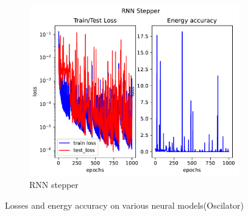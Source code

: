 \begin{figure}[H]
\begin{subfigure}[b]{0.3\textwidth}
		\includegraphics[width=\textwidth]{chapters/chapter5/osci_rne_loss.pdf}
		\caption{RNN stepper}
	\end{subfigure}
	
	\caption{Losses and energy accuracy on various neural models(Oscilator)}
	\label{osci_loss}
\end{figure}

